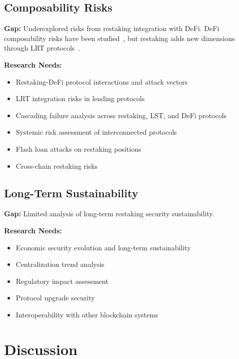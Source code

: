 \documentclass[runningheads]{llncs}
\begin{document}
\subsection{Composability Risks}

\textbf{Gap:} Underexplored risks from restaking integration with DeFi. DeFi composability risks have been studied~\cite{chen2021sok,gao2021flashloan,zhou2020high}, but restaking adds new dimensions through LRT protocols~\cite{renzo2024,etherfi2024,puffer2024,kelp2024}.

\textbf{Research Needs:}
\begin{itemize}
    \item Restaking-DeFi protocol interactions and attack vectors~\cite{chen2021sok}
    \item LRT integration risks in lending protocols~\cite{renzo2024,etherfi2024}
    \item Cascading failure analysis across restaking, LST, and DeFi protocols
    \item Systemic risk assessment of interconnected protocols
    \item Flash loan attacks on restaking positions~\cite{gao2021flashloan,zhou2020high}
    \item Cross-chain restaking risks~\cite{karak2024,li2023survey,belchior2021survey}
\end{itemize}

\subsection{Long-Term Sustainability}

\textbf{Gap:} Limited analysis of long-term restaking security sustainability.

\textbf{Research Needs:}
\begin{itemize}
    \item Economic security evolution and long-term sustainability
    \item Centralization trend analysis~\cite{chen2022rollup}
    \item Regulatory impact assessment
    \item Protocol upgrade security~\cite{perez2021security}
    \item Interoperability with other blockchain systems~\cite{herlihy2018atomic,zhang2021cross,li2023survey}
\end{itemize}

\vspace{-0.3cm}
\section{Discussion}
\label{sec:discussion}
\end{document}

